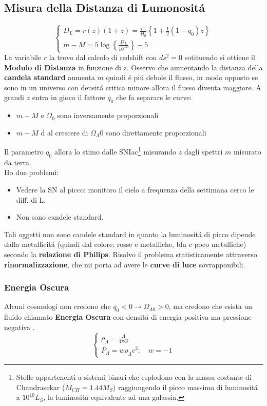 \documentclass[12pt, a4paper]{article}
\begin{document}
\subsection{Misura della Distanza di Lumonosit\'{a}}
\begin{equation}
     \begin{cases}
        D_L=r(z)(1+z)=\frac{cz}{H_0}\left\{1+\frac{1}{2}(1-q_0)z\right\}
         \\
        m-M=5\log{\left\{ \frac{D_L}{10^{-6}}\right\}-5}
     \end{cases}
\end{equation}
La variabile $r$ la trovo dal calcolo di redshift con $ds^2=0$ sotituendo si ottiene il \textbf{Modulo di Distanza} in funzione di z. Osservo che aumentando la distanza della \textbf{candela standard} aumenta $m$ quindi \'{e} pi\'{u} debole il flusso, in modo opposto se sono in un universo con densit\'{a} critica minore allora il flusso diventa maggiore. A grandi $z$ entra in gioco il fattore $q_0$ che fa separare le curve:
\begin{itemize}
    \item $m-M$ e $\Omega_0$ sono inversamente proporzionali
    \item $m-M$ d al crescere di $\Omega_\Lambda0$ sono direttamente proporzionali
\end{itemize}
Il parametro $q_0$ allora lo stimo dalle SNIac\footnote{Stelle appartenenti a sistemi binari che esplodono con la massa costante di Chandrasekar ($M_{CH}=1.44 M_S$) raggiungendo il picco massimo di luminosit\'{a} a $10^{10} L_S$, la luminosit\'a equivalente ad una galassia.} misurando $z$ dagli spettri $m$ misurato da terra.\\
Ho due  problemi:
\begin{itemize}
    \item Vedere la SN al picco: monitoro il cielo a frequenza della settimana cerco le diff. di L.
    \item Non sono candele standard.
\end{itemize}
Tali oggetti non sono candele standard in quanto la luminosit\'{a} di picco dipende dalla metallicit\'{a} (quindi dal colore: rosse e metalliche, blu e poco metalliche) secondo la \textbf{relazione di Philips}. Risolvo il problema statisticamente attraverso \textbf{rinormalizzazione}, che mi porta ad avere le \textbf{curve di luce} sovrapponibili.
\subsubsection{Energia Oscura}
Alcuni cosmologi non credono che $q_0<0 \rightarrow \Omega_{\Lambda0}>0$, ma credono che esista un fluido chiamato \textbf{Energia Oscura} con densit\'{a} di energia positiva ma pressione negativa .
\begin{equation}
     \begin{cases}
        \rho_{\Lambda}=\frac{\Lambda}{4 \pi G}
        \\
        P_{\Lambda}=w\rho_{\Lambda}c^2; \quad w=-1
     \end{cases}
\end{equation}
\newpage
\end{document}
